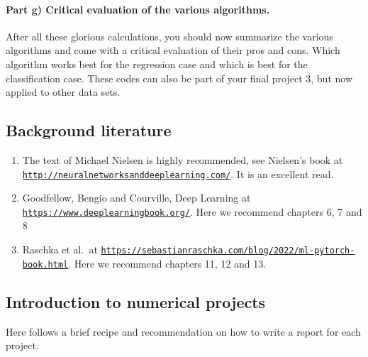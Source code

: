 \documentclass[%
oneside,                 %
final,                   %
10pt]{article}
\begin{document}
\epycod


\paragraph{Part g) Critical evaluation of the various algorithms.}
After all these glorious calculations, you should now summarize the
various algorithms and come with a critical evaluation of their pros
and cons. Which algorithm works best for the regression case and which
is best for the classification case. These codes can also be part of
your final project 3, but now applied to other data sets.

\subsection{Background literature}

\begin{enumerate}
\item The text of Michael Nielsen is highly recommended, see Nielsen's book at \href{{http://neuralnetworksanddeeplearning.com/}}{\nolinkurl{http://neuralnetworksanddeeplearning.com/}}. It is an excellent read.

\item Goodfellow, Bengio and Courville, Deep Learning at \href{{https://www.deeplearningbook.org/}}{\nolinkurl{https://www.deeplearningbook.org/}}. Here we recommend chapters 6, 7 and 8

\item Raschka et al.~at \href{{https://sebastianraschka.com/blog/2022/ml-pytorch-book.html}}{\nolinkurl{https://sebastianraschka.com/blog/2022/ml-pytorch-book.html}}. Here we recommend chapters 11, 12 and 13.
\end{enumerate}

\noindent
\subsection{Introduction to numerical projects}

Here follows a brief recipe and recommendation on how to write a report for each
project.
\end{document}
